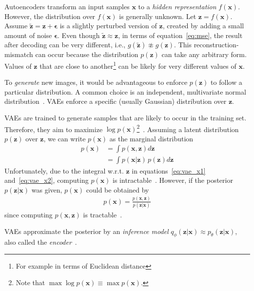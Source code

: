 Autoencoders transform an input samples $\bm{x}$ to a \textit{hidden representation} $f(\bm{x})$.
However, the distribution over $f(\bm{x})$ is generally unknown.
Let $\bm{z} = f(\bm{x})$.
Assume $\bm{\tilde{z}} = \bm{z} + \bm{\epsilon}$ is a slightly perturbed version of $\bm{z}$, created by adding a small amount of noise $\bm{\epsilon}$.
Even though $\bm{\tilde{z}} \approx \bm{z}$, in terms of equation~\ref{eq:mse}, the result after decoding can be very different, i.e., $g(\bm{\tilde{z}}) \not\approx g(\bm{z})$.
This reconstruction-mismatch can occur because the distribution $p(\bm{z})$ can take any arbitrary form.
Values of $\bm{z}$ that are close to another\footnote{For example in terms of Euclidean distance} can be likely for very different values of $\bm{x}$.

To \textit{generate} new images, it would be advantageous to enforce $p(\bm{z})$ to follow a particular distribution.
A common choice is an independent, multivariate normal distribution~\citep[pp. 24, 25]{kingma2019introduction}.
\acp{VAE} enforce a specific (usually Gaussian) distribution over $\bm{z}$.

\acp{VAE} are trained to generate samples that are likely to occur in the training set.
Therefore, they aim to maximize $\log p(\bm{x})$\footnote{Note that $\max \log  p(\bm{x}) \equiv \max  p(\bm{x})$.}~\citep[p. 18]{kingma2019introduction}.
Assuming a latent distribution $p(\bm{z})$ over $\bm{z}$, we can write $p(\bm{x})$ as the marginal distribution
\begin{align}
    p(\bm{x}) &= \int p(\bm{x}, \bm{z})d\bm{z} \label{eq:vae_x1}\\
    &= \int p(\bm{x}|\bm{z})\,p(\bm{z})d\bm{z} \label{eq:vae_x2}
\end{align}
Unfortunately, due to the integral w.r.t. $\bm{z}$ in equations~\ref{eq:vae_x1} and~\ref{eq:vae_x2}, computing $p(\bm{x})$ is intractable~\citep[p. 13]{kingma2019introduction}.
However, if the posterior $p(\bm{z}|\bm{x})$ was given, $p(\bm{x})$ could be obtained by
\begin{align}
    p(\bm{x}) = \frac{p(\bm{x}, \bm{z})}{p(\bm{z}|\bm{x})}
\end{align}
since computing $p(\bm{x}, \bm{z})$ is tractable~\citep[p. 14]{kingma2019introduction}.

\acp{VAE} approximate the posterior by an \textit{inference model} $q_\phi(\bm{z}|\bm{x}) \approx p_\theta(\bm{z}|\bm{x})$, also called the \textit{encoder}~\citep[p. 15]{kingma2019introduction}.

